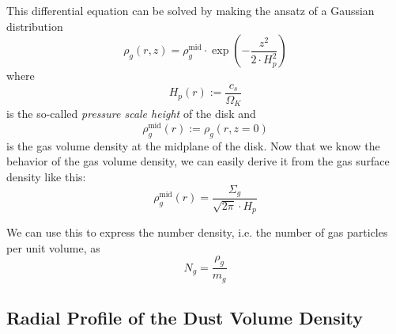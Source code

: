         This differential equation can be solved by making the ansatz of a Gaussian distribution
        \begin{equation}
            \boxed{
                \rho_g(r,z) = \rho_g^\text{mid}\cdot\exp\left(-\frac{z^2}{2\cdot H_p^2}\right)
            }
        \end{equation}
        where
        \begin{equation}
            H_p(r) :=\frac{c_s}{\Omega_K}  %
        \end{equation}
        is the so-called \textit{pressure scale height} of the disk
        and
        \begin{equation}
            \rho_g^\text{mid}(r) := \rho_g(r,z=0)
        \end{equation}
        is the gas volume density at the midplane of the disk.
        Now that we know the behavior of the gas volume density, we can easily derive it from 
        the gas surface density like this: %
        \begin{equation}
            \label{eq:gas_volume_density_vs_distance_from_star}
            \boxed{\rho_g^\text{mid}(r) =\frac{\Sigma_g}{\sqrt{2\pi}\cdot H_p}}
        \end{equation}


        We can use this to express the number density, i.e. 
        the number of gas particles per unit volume, as
        \begin{equation}
            N_g
                =\frac{\rho_g}{m_g}
        \end{equation}


    \subsection{Radial Profile of the Dust Volume Density}


